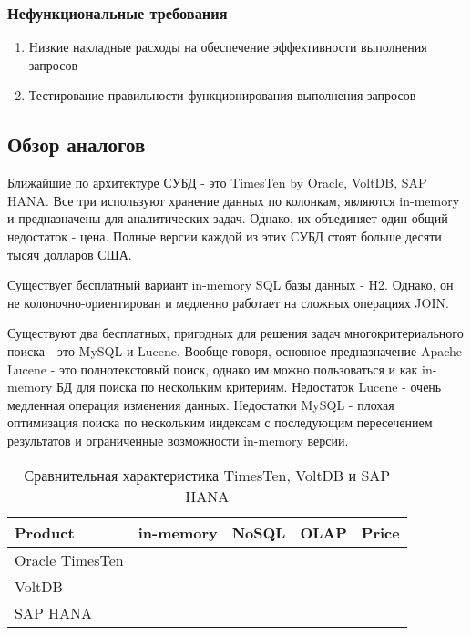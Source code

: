 \documentclass{matmex-diploma}
\begin{document}
        \subsubsection{Нефункциональные требования}
            \begin{enumerate} 
                    \item Низкие накладные расходы на обеспечение эффективности выполнения запросов
                    \item Тестирование правильности функционирования выполнения запросов
            \end{enumerate}
    \subsection{Обзор аналогов}
        Ближайшие по архитектуре СУБД - это TimesTen by Oracle, VoltDB, SAP HANA. Все три используют хранение данных по колонкам, являются in-memory и предназначены для аналитических задач. Однако, их объединяет один общий недостаток - цена. Полные версии каждой из этих СУБД стоят больше десяти тысяч долларов США.
    
    Существует бесплатный вариант in-memory SQL базы данных - H2. Однако, он не колоночно-ориентирован и медленно работает на сложных операциях JOIN.
    
    Существуют два бесплатных, пригодных для решения задач многокритериального поиска - это MySQL и Lucene. Вообще говоря, основное предназначение Apache Lucene - это полнотекстовый поиск, однако им можно пользоваться и как in-memory БД для поиска по нескольким критериям. Недостаток Lucene - очень медленная операция изменения данных. Недостатки MySQL - плохая оптимизация поиска по нескольким индексам с последующим пересечением результатов и ограниченные возможности in-memory версии. 
    
    \begin{table}[h]
        \centering
        \begin{tabular}{| l | c | c | c | c |}
            \hline
            Product & in-memory & NoSQL & OLAP & Price \\
            \hline
            Oracle TimesTen & \color{green}{\checkmark} & \color{green}{\checkmark} & \color{green}{\checkmark} & \color{red}{€19,969.00} \\
            \hline 
            VoltDB          & \color{green}{\checkmark} & \color{green}{\checkmark} & \color{green}{\checkmark} & \color{red}{\$3500/month} \\
            \hline
            SAP HANA        & \color{green}{\checkmark} & \color{green}{\checkmark} & \color{green}{\checkmark} & \color{red}{\$3595/month}\\
            \hline
        \end{tabular}
        \caption{Сравнительная характеристика TimesTen, VoltDB и SAP HANA}
    \end{table}
    
\end{document}
